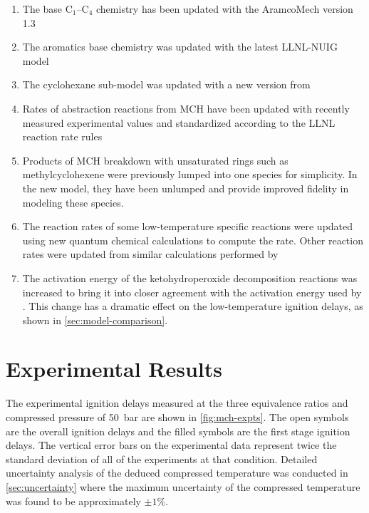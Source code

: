 \documentclass[12pt, letterpaper]{article}
\begin{document}
\begin{enumerate}
    \item The base C$_1$--C$_4$ chemistry has been updated with the AramcoMech
        version 1.3 \cite{Metcalfe2013}
    \item The aromatics base chemistry was updated with the latest LLNL-NUIG
        model \cite{Nakamura2014}
    \item The cyclohexane sub-model was updated with a new version from
        \textcite{Silke2007}
    \item Rates of abstraction reactions from MCH have been updated
        with recently measured experimental values \cite{Sivaramakrishnan2009}
        and standardized according to the LLNL reaction rate rules \cite{Sarathy2011b}
    \item Products of MCH breakdown with unsaturated rings such as
        methylcyclohexene were previously lumped into one species for
        simplicity. In the new model, they have been unlumped and
        provide improved fidelity in modeling these species. \cite{Pitz2013}
    \item The reaction rates of some low-temperature specific reactions were
        updated using new quantum chemical calculations to compute the rate.
        Other reaction rates were updated from similar calculations performed
        by \textcite{Fernandes2009}
    \item The activation energy of the ketohydroperoxide decomposition
        reactions was increased to bring it into closer agreement with
        the activation energy used by \textcite{Metcalfe2013}. This change
        has a dramatic effect on the low-temperature ignition delays, as shown
        in \autoref{sec:model-comparison}.
\end{enumerate}

\section{Experimental Results}
\label{sec:experimental-results}

The experimental ignition delays measured at the three equivalence ratios and
compressed pressure of \SI{50}{\bar} are shown in \autoref{fig:mch-expts}. The open symbols are the
overall ignition delays and the filled symbols are the first stage ignition
delays. The vertical error bars on the experimental data represent twice the
standard deviation of all of the experiments at that condition. Detailed
uncertainty analysis of the deduced compressed temperature was conducted
in \autoref{sec:uncertainty} where the maximum uncertainty of the compressed
temperature was found to be approximately $\pm 1\%$.
\end{document}
